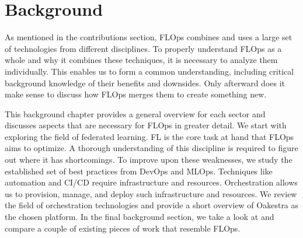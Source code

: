 \chapter{Background}\label{chapter:background}

As mentioned in the contributions section, FLOps combines and uses a large set of technologies from
different disciplines. To properly understand FLOps as a whole and why it combines these techniques,
it is necessary to analyze them individually.
This enables us to form a common understanding, including critical background knowledge of their benefits and downsides.
Only afterward does it make sense to discuss how FLOps merges them to create something new.

This background chapter provides a general overview for each sector and discusses aspects that
are necessary for FLOps in greater detail.
We start with exploring the field of federated learning.
FL is the core task at hand that FLOps aims to optimize.
A thorough understanding of this discipline is required to figure out where it has shortcomings.
To improve upon these weaknesses, we study the established set of 
best practices from DevOps and MLOps.
Techniques like automation and CI/CD require infrastructure and resources.
Orchestration allows us to provision, manage, and deploy such infrastructure and resources.
We review the field of orchestration technologies and provide a short
overview of Oakestra \cite{paper:oakestra_usenix} as the chosen platform.
In the final background section, we take a look at and compare a couple of existing pieces of work
that resemble FLOps.








